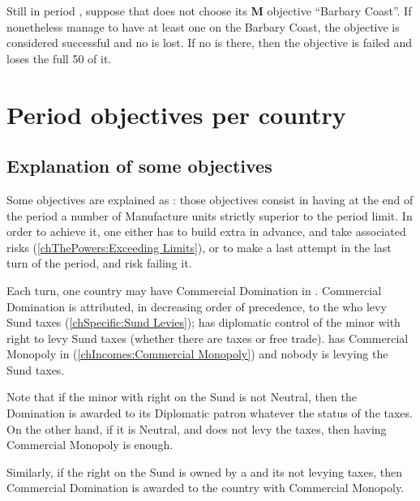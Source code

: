 \begin{exemple}
  Still in period , suppose that \HIS does not choose its {\bf M}
  objective ``Barbary Coast''. If \HIS nonetheless manage to have at least one
  \Presidio on the Barbary Coast, the objective is considered successful and
  no \VP is lost. If no \Presidio is there, then the objective is failed and
  \HIS loses the full 50 \VPs of it.
\end{exemple}

\section{Period objectives per country}
\label{chVictories:objectives}

\subsection{Explanation of some objectives}

\aparag[MNU.] Some objectives are explained as \MNU: those objectives
consist in having at the end of the period a number of Manufacture units
strictly superior to the period limit.
\bparag In order to achieve it, one either has to build extra \MNU in
advance, and take associated risks (\ref{chThePowers:Exceeding Limits}),
or to make a last attempt in the last turn of the period, and risk
failing it.

 Each turn, one country
may have Commercial Domination in . Commercial Domination
is attributed, in decreasing order of precedence, to the \MAJ who
\bparag levy Sund taxes (\ref{chSpecific:Sund Levies});
\bparag has diplomatic control of the minor with right to levy Sund
taxes (whether there are taxes or free trade).
\bparag has Commercial Monopoly in 
(\ref{chIncomes:Commercial Monopoly}) and nobody is levying the Sund
taxes.

\begin{designnote}
  Note that if the minor with right on the Sund is not Neutral, then the
  Domination is awarded to its Diplomatic patron whatever the status of
  the taxes. On the other hand, if it is Neutral, and does not levy the
  taxes, then having Commercial Monopoly is enough.

  Similarly, if the right on the Sund is owned by a \MAJ and its not
  levying taxes, then Commercial Domination is awarded to the country
  with Commercial Monopoly.
\end{designnote}

